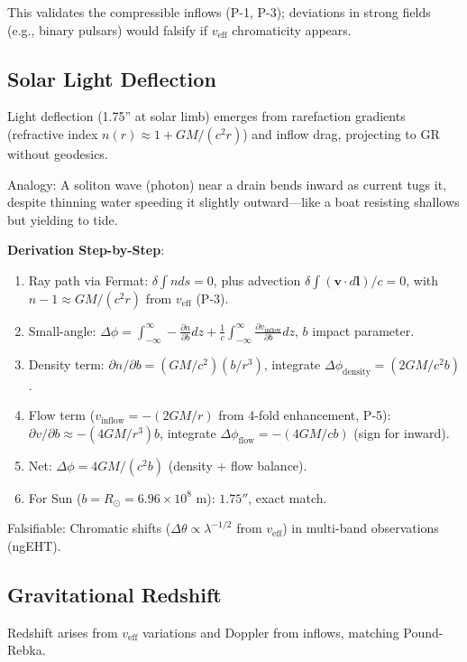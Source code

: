 \documentclass{article}
\begin{document}
This validates the compressible inflows (P-1, P-3); deviations in strong fields (e.g., binary pulsars) would falsify if $v_{\text{eff}}$ chromaticity appears.

\subsection{Solar Light Deflection}

Light deflection (1.75'' at solar limb) emerges from rarefaction gradients (refractive index $n(r) \approx 1 + GM/(c^2 r)$) and inflow drag, projecting to GR without geodesics.

Analogy: A soliton wave (photon) near a drain bends inward as current tugs it, despite thinning water speeding it slightly outward—like a boat resisting shallows but yielding to tide.

\textbf{Derivation Step-by-Step}:
\begin{enumerate}
    \item Ray path via Fermat: $\delta \int n ds = 0$, plus advection $\delta \int (\mathbf{v} \cdot d\mathbf{l}) / c = 0$, with $n-1 \approx GM / (c^2 r)$ from $v_{\text{eff}}$ (P-3).
    \item Small-angle: $\Delta\phi = \int_{-\infty}^\infty -\frac{\partial n}{\partial b} dz + \frac{1}{c} \int_{-\infty}^\infty \frac{\partial v_{\text{inflow}}}{\partial b} dz$, $b$ impact parameter.
    \item Density term: $\partial n / \partial b = (GM / c^2) (b / r^3)$, integrate $\Delta\phi_{\text{density}} = (2 GM / c^2 b)$.
    \item Flow term ($v_{\text{inflow}} = - (2 GM / r)$ from 4-fold enhancement, P-5): $\partial v / \partial b \approx - (4 GM / r^3) b$, integrate $\Delta\phi_{\text{flow}} = - (4 GM / c b)$ (sign for inward).
    \item Net: $\Delta\phi = 4 GM / (c^2 b)$ (density + flow balance).
    \item For Sun ($b = R_\odot = 6.96 \times 10^8$ m): $1.75''$, exact match.
\end{enumerate}

Falsifiable: Chromatic shifts ($\Delta\theta \propto \lambda^{-1/2}$ from $v_{\text{eff}}$) in multi-band observations (ngEHT).

\subsection{Gravitational Redshift}

Redshift arises from $v_{\text{eff}}$ variations and Doppler from inflows, matching Pound-Rebka.
\end{document}
